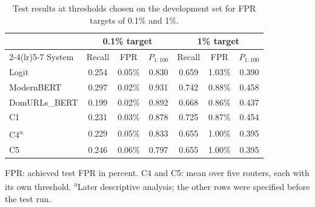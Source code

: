 \begin{table}[!t]
\caption{Test results at thresholds chosen on the development set for FPR targets of 0.1\% and 1\%.}
\label{tab:fixed-fpr}
\centering\footnotesize
\setlength{\tabcolsep}{2.4pt}
\begin{tabular}{@{}lcccccc@{}}
\toprule
 & \multicolumn{3}{c}{0.1\% target} & \multicolumn{3}{c}{1\% target} \\ \cmidrule(lr){2-4}\cmidrule(lr){5-7} System & Recall & FPR & $P_{1:100}$ & Recall & FPR & $P_{1:100}$ \\
\midrule
Logit & 0.254 & 0.05\% & 0.830 & 0.659 & 1.03\% & 0.390 \\
ModernBERT & 0.297 & 0.02\% & 0.931 & 0.742 & 0.88\% & 0.458 \\
DomURLs\_BERT & 0.199 & 0.02\% & 0.892 & 0.668 & 0.86\% & 0.437 \\
C1 & 0.231 & 0.03\% & 0.878 & 0.725 & 0.87\% & 0.454 \\
C4\textsuperscript{a} & 0.229 & 0.05\% & 0.833 & 0.655 & 1.00\% & 0.395 \\
C5 & 0.246 & 0.06\% & 0.797 & 0.655 & 1.00\% & 0.395 \\
\bottomrule
\end{tabular}
\par\smallskip\begin{minipage}{\linewidth}\scriptsize FPR: achieved test FPR in percent. C4 and C5: mean over five routers, each with its own threshold. \textsuperscript{a}Later descriptive analysis; the other rows were specified before the test run.\end{minipage}
\end{table}
